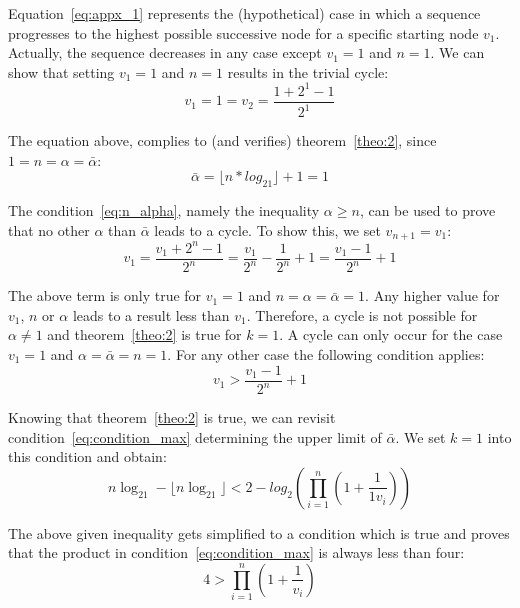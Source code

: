 Equation~\ref{eq:appx_1} represents the (hypothetical) case in which a sequence progresses to the highest possible successive node for a specific starting node $v_1$. Actually, the sequence decreases in any case except $v_1=1$ and $n=1$. We can show that setting $v_1=1$ and $n=1$ results in the trivial cycle:
\[
v_1=1=v_2=\frac{1+2^1-1}{2^1}
\]

The equation above, complies to (and verifies) theorem~\ref{theo:2}, since $1=n=\alpha=\bar\alpha$:
\[
\bar\alpha=\lfloor n*log_21\rfloor+1=1
\]

The condition~\ref{eq:n_alpha}, namely the inequality $\alpha\ge n$, can be used to prove that no other $\alpha$ than $\bar\alpha$ leads to a cycle. To show this, we set $v_{n+1}=v_1$:
\[
v_1=\frac{v_1+2^n-1}{2^n}=\frac{v_1}{2^n}-\frac{1}{2^n}+1=\frac{v_1-1}{2^n}+1
\]

The above term is only true for $v_1=1$ and $n=\alpha=\bar\alpha=1$. Any higher value for $v_1$, $n$ or $\alpha$ leads to a result less than $v_1$. Therefore, a cycle is not possible for $\alpha\ne 1$ and theorem~\ref{theo:2} is true for $k=1$. A cycle can only occur for the case $v_1=1$ and $\alpha=\bar\alpha=n=1$. For any other case the following condition applies:
\[
v_1>\frac{v_1-1}{2^n}+1
\]

Knowing that theorem~\ref{theo:2} is true, we can revisit condition~\ref{eq:condition_max} determining the upper limit of $\bar\alpha$. We set $k=1$ into this condition and obtain:
\begin{equation}
n\log_21-\lfloor n\log_21\rfloor<2-log_2\left(\prod_{i=1}^{n}\left(1+\frac{1}{1v_{i}}\right)\right)
\end{equation}

The above given inequality gets simplified to a condition which is true and proves that the product in condition~\ref{eq:condition_max} is always less than four:
\[
4>\prod_{i=1}^{n}\left(1+\frac{1}{v_{i}}\right)
\]




